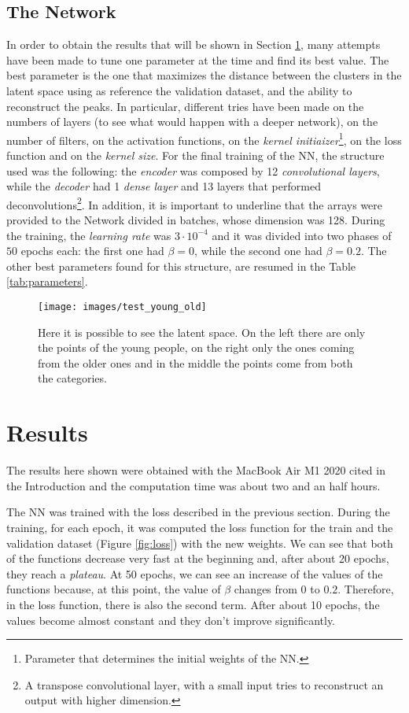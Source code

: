 \documentclass[12pt,a4paper,twocolumn]{article}
\begin{document}
			\subsection{The Network}
			In order to obtain the results that will be shown in Section \ref{Results}, many attempts have been made to tune one parameter at the time and find its best value. The best parameter is the one that maximizes the distance between the clusters in the latent space using as reference the validation dataset, and the ability to reconstruct the peaks. In particular, different tries have been made on the numbers of layers (to see what would happen with a deeper network), on the number of filters, on the activation functions, on the \emph{kernel initiaizer}\footnote{Parameter that determines the initial weights of the NN.}, on the loss function and on the \emph{kernel size}. For the final training of the NN, the structure used was the following: the \emph{encoder} was composed by 12 \emph{convolutional layers}, while the \emph{decoder} had 1 \emph{dense layer} and 13 layers that performed deconvolutions\footnote{A transpose convolutional layer, with a small input tries to reconstruct an output with higher dimension.}. In addition, it is important to underline that the arrays were provided to the Network divided in batches, whose dimension was 128. During the training, the \emph{learning rate} was $3\cdot 10^{-4}$ and it was divided into two phases of $50$ epochs each: the first one had $\beta=0$, while the second one had $\beta=0.2$.
			The other best parameters found for this structure, are resumed in the Table \ref{tab:parameters}. 
			\begin{figure*}
				\centering
				\texttt{[image: images/test\_young\_old]}
				\caption{Here it is possible to see the latent space. On the left there are only the points of the young people, on the right only the ones coming from the older ones and in the middle the points come from both the categories.}
				\label{fig:youngold}
			\end{figure*}
			
			\section{Results}
			\label{Results}
			The results here shown were obtained with the MacBook Air M1 2020 cited in the Introduction and the computation time was about two and an half hours. 
			
			The NN was trained with the loss described in the previous section. During the training, for each epoch, it was computed the loss function for the train and the validation dataset (Figure \ref{fig:loss}) with the new weights. We can see that both of the functions decrease very fast at the beginning and, after about 20 epochs, they reach a \emph{plateau}. At 50 epochs, we can see an increase of the values of the functions because, at this point, the value of $\beta$ changes from 0 to $0.2$. Therefore, in the loss function, there is also the second term. After about 10 epochs, the values become almost constant and they don't improve significantly.
		
\end{document}
